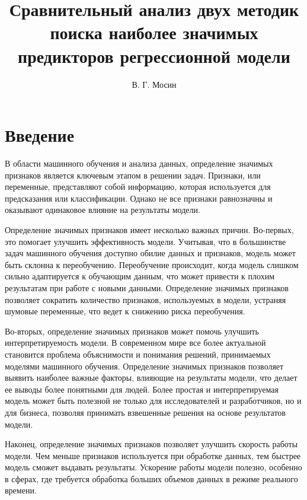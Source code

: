 \documentclass[a4paper,12pt]{article}
\title{Сравнительный анализ двух методик поиска наиболее значимых предикторов регрессионной модели}
\author{В. Г. Мосин}
\date{}
\begin{document}
	\maketitle
	
\tableofcontents
	
\section{Введение}
В области машинного обучения и анализа данных, определение значимых признаков является ключевым этапом в решении задач. Признаки, или переменные, представляют собой информацию, которая используется для предсказания или классификации. Однако не все признаки равнозначны и оказывают одинаковое влияние на результаты модели.

Определение значимых признаков имеет несколько важных причин. Во-первых, это помогает улучшить эффективность модели. Учитывая, что в большинстве задач машинного обучения доступно обилие данных и признаков, модель может быть склонна к переобучению. Переобучение происходит, когда модель слишком сильно адаптируется к обучающим данным, что может привести к плохим результатам при работе с новыми данными. Определение значимых признаков позволяет сократить количество признаков, используемых в модели, устраняя шумовые переменные, что ведет к снижению риска переобучения.

Во-вторых, определение значимых признаков может помочь улучшить интерпретируемость модели. В современном мире все более актуальной становится проблема объяснимости и понимания решений, принимаемых моделями машинного обучения. Определение значимых признаков позволяет выявить наиболее важные факторы, влияющие на результаты модели, что делает ее выводы более понятными для людей. Более простая и интерпретируемая модель может быть полезной не только для исследователей и разработчиков, но и для бизнеса, позволяя принимать взвешенные решения на основе результатов модели.

Наконец, определение значимых признаков позволяет улучшить скорость работы модели. Чем меньше признаков используется при обработке данных, тем быстрее модель сможет выдавать результаты. Ускорение работы модели полезно, особенно в сферах, где требуется обработка больших объемов данных в режиме реального времени.
\end{document}
